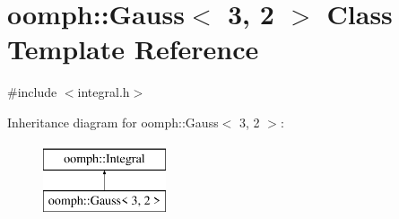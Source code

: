 \hypertarget{classoomph_1_1Gauss_3_013_00_012_01_4}{}\section{oomph\+:\+:Gauss$<$ 3, 2 $>$ Class Template Reference}
\label{classoomph_1_1Gauss_3_013_00_012_01_4}


{\ttfamily \#include $<$integral.\+h$>$}

Inheritance diagram for oomph\+:\+:Gauss$<$ 3, 2 $>$\+:\begin{figure}[H]
\begin{center}
\leavevmode
\includegraphics[height=2.000000cm]{classoomph_1_1Gauss_3_013_00_012_01_4}
\end{center}
\end{figure}
